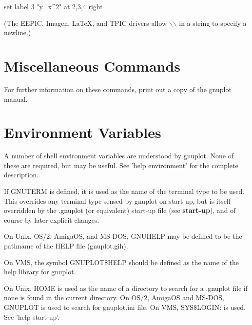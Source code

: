 {set label 3 "y=x^2" at 2,3,4 right}

(The EEPIC, Imagen, LaTeX, and TPIC drivers allow $\backslash$$\backslash$
in a string to specify a newline.)

\section{Miscellaneous Commands}

For further information on these commands, print out a copy
of the gnuplot manual.


\section{Environment Variables}

A number of shell environment variables are understood by gnuplot.
None of these are required, but may be useful.
See 'help environment' for the complete description.

If GNUTERM is defined, it is used as the name of the terminal type to
be used. This overrides any terminal type sensed by gnuplot on start
up, but is itself overridden by the .gnuplot (or equivalent) start-up
file (see {\bf start-up}), and of course by later explicit changes.

On Unix, OS/2, AmigaOS, and MS-DOS, GNUHELP may be defined to be the pathname
of the HELP file (gnuplot.gih).

On VMS, the symbol GNUPLOT\$HELP should be defined as the name of
the help library for gnuplot.

On Unix, HOME is used as the name of a directory to search for
a .gnuplot file if none is found in the current directory.
On OS/2, AmigaOS and MS-DOS, GNUPLOT is used to search for gnuplot.ini file.
On VMS, SYS\$LOGIN: is used. See 'help start-up'.

